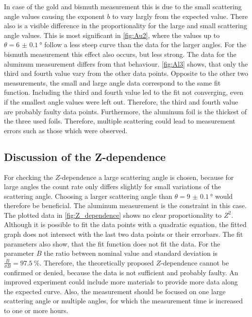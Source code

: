 In case of the gold and bismuth measurement this is due to the small scattering angle values causing the exponent $b$ to vary largly from the expected value.
There also is a visible difference in the proportionality for the large and small scattering angle values.
This is most significant in \autoref{fig:Au2}, where the values up to $\theta = \qty{6(0.1)}{\degree}$ follow a less steep curve than the data for the larger angles.
For the bismuth measurement this effect also occurs, but less strong.
\newline\noindent
The data for the aluminum measurement differs from that behaviour.
\autoref{fig:Al3} shows, that only the third and fourth value vary from the other data points.
Opposite to the other two measurements, the small and large angle data correspond to the same fit function.
Including the third and fourth value led to the fit not converging, even if the smallest angle values were left out.
Therefore, the third and fourth value are probably faulty data points.
\newline\noindent
Furthermore, the aluminum foil is the thickest of the three used foils.
Therefore, multiple scattering could lead to measurement errors such as those which were observed.
%
\subsection{Discussion of the Z-dependence}
For checking the $Z$-dependence a large scattering angle is chosen, because for large angles the count rate only differs slightly for small variations of the scattering angle.
Choosing a larger scattering angle than $\theta = \qty{9(0.1)}{\degree}$ would therefore be beneficial.
The aluminum measurement is the constraint in this case.
\newline\noindent
The plotted data in \autoref{fig:Z_dependence} shows no clear proportionality to $Z^2$.
Although it is possible to fit the data points with a quadratic equation, the fitted graph does not intersect with the last two data points or their errorbars.
The fit parameters also show, that the fit function does not fit the data.
For the parameter $B$ the ratio between nominal value and standard deviation is $\frac{B}{\sigma B} = \qty{97.5}{\percent}$.
\newline\noindent
Therefore, the theoretically proposed $Z$-dependence cannot be confirmed or denied, because the data is not sufficient and probably faulty.
An improved experiment could include more materials to provide more data along the expected curve.
Also, the measurement should be focused on one large scattering angle or multiple angles, for which the measurement time is increased to one or more hours.